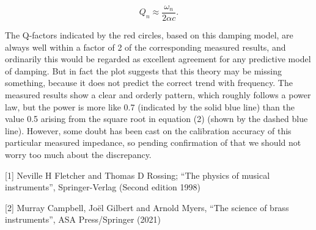   \begin{equation*}Q_n \approx \frac{\omega_n}{2 \alpha c} . 
  \tag{4}\end{equation*} 

  The Q-factors indicated by the red circles, based on this damping model, are 
  always well within a factor of 2 of the corresponding measured results, and 
  ordinarily this would be regarded as excellent agreement for any predictive 
  model of damping. But in fact the plot suggests that this theory may be 
  missing something, because it does not predict the correct trend with 
  frequency. The measured results show a clear and orderly pattern, which 
  roughly follows a power law, but the power is more like 0.7 (indicated by the 
  solid blue line) than the value 0.5 arising from the square root in equation 
  (2) (shown by the dashed blue line). However, some doubt has been cast on the 
  calibration accuracy of this particular measured impedance, so pending 
  confirmation of that we should not worry too much about the discrepancy. 

  \sectionreferences{}[1] Neville H Fletcher and Thomas D Rossing; “The physics 
  of musical instruments”, Springer-Verlag (Second edition 1998) 

  [2] Murray Campbell, Joël Gilbert and Arnold Myers, “The science of brass 
  instruments”, ASA Press/Springer (2021) 
